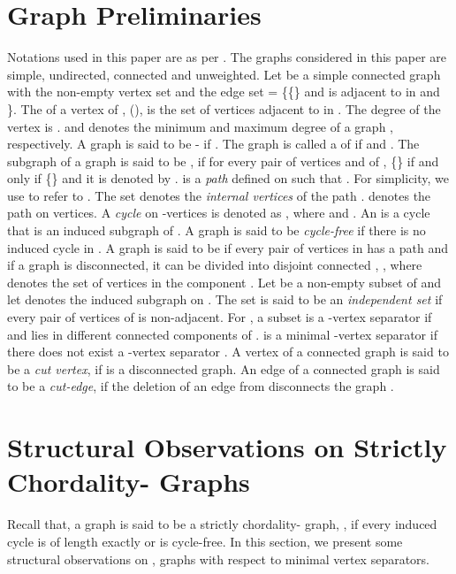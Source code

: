 \documentclass[runningheads]{llncs}
\begin{document}
\section{Graph Preliminaries}

Notations used in this paper are as per \cite{golumbicbook,dbwest}. The graphs considered in this paper are simple, undirected, connected and unweighted. Let  be a simple connected graph with the non-empty vertex set  and the edge set = \{\{\}   and  is adjacent to  in  and \}. The  of a vertex  of , (), is the set of vertices adjacent to  in . The degree of the vertex  is .  and  denotes the minimum and maximum degree of a graph , respectively. A graph  is said to be - if . The graph  is called a  of  if    and . The subgraph  of a graph  is said to be  , if for every pair of vertices  and  of , \{\}   if and only if \{\}   and it is denoted by .  is a \emph{path} defined on  such that . For simplicity, we use  to refer to  . The set  denotes the \emph{internal vertices} of the path .  denotes the path on  vertices. A \emph{cycle}  on -vertices is denoted as , where  and . An   is a cycle that is an induced subgraph of . A graph  is said to be \emph{cycle-free} if there is no induced cycle in . A graph  is said to be  if every pair of vertices in  has a path and if a graph is disconnected, it can be divided into disjoint connected  , , where  denotes the set of vertices in the component . Let  be a non-empty subset of  and let  denotes the induced subgraph on . The set  is said to be an \emph{independent set} if every pair of vertices of  is non-adjacent. For , a subset  is a -vertex separator if  and  lies in different connected components of .  is a minimal -vertex separator if there does not exist a -vertex separator . A vertex  of a connected graph  is said to be a \emph{cut vertex}, if  is a disconnected graph. An edge  of a connected graph  is said to be a \emph{cut-edge}, if the deletion of an edge  from  disconnects the graph . 


 
\section{Structural Observations on Strictly Chordality- Graphs}
Recall that, a graph  is said to be a strictly chordality- graph, , if every induced cycle is of length exactly  or  is cycle-free. In this section, we present some structural observations on , graphs with respect to minimal vertex separators.
\end{document}
